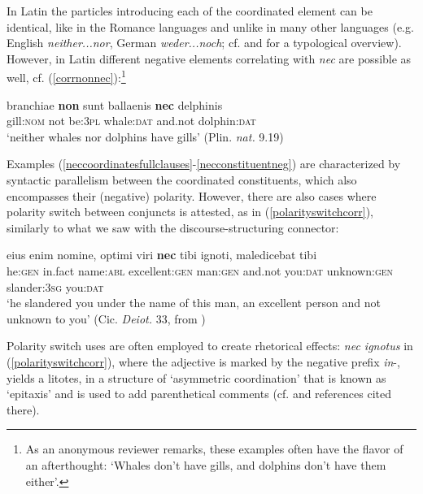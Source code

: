 \documentclass[output=paper,modfonts,nonflat,citecolor=brown,
showindex
]{langsci/langscibook}
\begin{document}
\noindent In Latin the particles introducing each of the coordinated element can be identical, like in the Romance languages and unlike in many other languages (e.g. English {\emph{neither...nor}}, German {\emph{weder...noch}}; cf. \citealt[100-106]{BerniniRamat96} and \citealt{Haspelmath07} for a typological overview). However, in Latin different negative elements correlating with {\emph{nec}} are possible as well, cf. (\ref{corrnonnec}):{\footnote{As an anonymous reviewer remarks, these examples often have the flavor of an afterthought: `Whales don't have gills, and dolphins don't have them either'.}}

{\begin{exe}
\ex \label{corrnonnec} \gll branchiae {\textbf{non}} sunt ballaenis {\textbf{nec}} delphinis\\
gill:{\textsc{nom}} not be:{\textsc{3pl}} whale:{\textsc{dat}} and.not dolphin:{\textsc{dat}}\\

`neither whales nor dolphins have gills' (Plin. {\emph{nat.}} 9.19)
\end{exe}}

\noindent Examples (\ref{neccoordinatesfullclauses}-\ref{necconstituentneg}) are characterized by syntactic parallelism between the coordinated constituents, which also encompasses their (negative) polarity. However, there are also cases where polarity switch between conjuncts is attested, as in (\ref{polarityswitchcorr}), similarly to what we saw with the discourse-structuring connector:

{\begin{exe}
\ex \label{polarityswitchcorr} \gll eius enim nomine, optimi viri {\textbf{nec}} tibi ignoti, maledicebat tibi\\
he:{\textsc{gen}} in.fact name:{\textsc{abl}} excellent:{\textsc{gen}} man:{\textsc{gen}} and.not you:{\textsc{dat}} unknown:{\textsc{gen}} slander:{\textsc{3sg}} you:{\textsc{dat}}\\

`he slandered you under the name of this man, an excellent person and not unknown to you' (Cic. {\emph{Deiot.}} 33, from \citealt[688]{Pinkster15})
\end{exe}}

\noindent Polarity switch uses are often employed to create rhetorical effects: {\emph{nec ignotus}} in (\ref{polarityswitchcorr}), where the adjective is marked by the negative prefix {\emph{in}}-, yields a litotes, in a structure of `asymmetric coordination' that is known as `epitaxis' and is used to add parenthetical comments (cf. \citealt[]{OrlandiniPoccetti07} and references cited there). 
\end{document}

